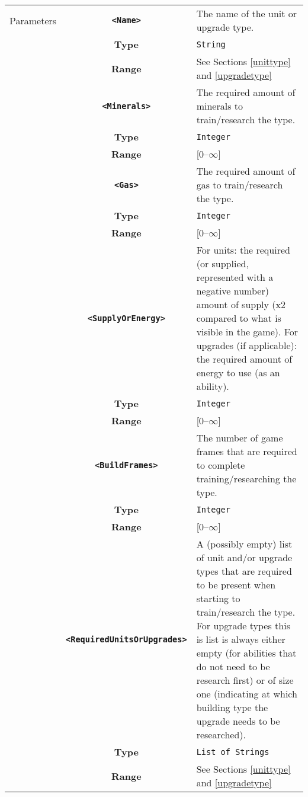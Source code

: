  \begin{tabularx}{\textwidth}{l | c | p{8cm}|}
 \cline{2-3}
 Parameters & \textbf{\verb|<Name>|} & The name of the unit or upgrade type. \\
            & \textbf{Type} & \verb|String| \\
            & \textbf{Range} & See Sections \ref{unittype} and \ref{upgradetype} \\
            \cline{2-3}
            & \textbf{\verb|<Minerals>|} & The required amount of minerals to train/research the type. \\
            & \textbf{Type} & \verb|Integer| \\
            & \textbf{Range} & [0--$\infty$] \\
            \cline{2-3}
            & \textbf{\verb|<Gas>|} & The required amount of gas to train/research the type. \\
            & \textbf{Type} & \verb|Integer| \\
            & \textbf{Range} & [0--$\infty$] \\
            \cline{2-3}
            & \textbf{\verb|<SupplyOrEnergy>|} & For units: the required (or supplied, represented with a negative number) amount of supply (x2 compared to what is visible in the game). For upgrades (if applicable): the required amount of energy to use (as an ability).\\
            & \textbf{Type} & \verb|Integer| \\
            & \textbf{Range} & [0--$\infty$] \\
            \cline{2-3}
            & \textbf{\verb|<BuildFrames>|} & The number of game frames that are required to complete training/researching the type.\\
            & \textbf{Type} & \verb|Integer| \\
            & \textbf{Range} & [0--$\infty$] \\
            \cline{2-3}
            & \textbf{\verb|<RequiredUnitsOrUpgrades>|} & A (possibly empty) list of unit and/or upgrade types that are required to be present when starting to train/research the type. For upgrade types this is list is always either empty (for abilities that do not need to be research first) or of size one (indicating at which building type the upgrade needs to be researched). \\
            & \textbf{Type} & \verb|List of Strings| \\
            & \textbf{Range} & See Sections \ref{unittype} and \ref{upgradetype} \\
            \cline{2-3}
\end{tabularx}

